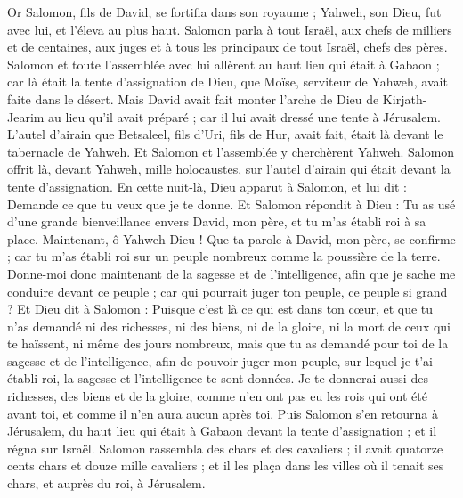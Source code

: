 \begin{multicols}{2}
\VerseOne{}Or Salomon, fils de David, se fortifia dans son royaume ; Yahweh, son Dieu, fut avec lui, et l'éleva au plus haut.
Salomon parla à tout Israël, aux chefs de milliers et de centaines, aux juges et à tous les principaux de tout Israël, chefs des pères.
Salomon et toute l'assemblée avec lui allèrent au haut lieu qui était à Gabaon ; car là était la tente d'assignation de Dieu, que Moïse, serviteur de Yahweh, avait faite dans le désert.
Mais David avait fait monter l'arche de Dieu de Kirjath-Jearim au lieu qu'il avait préparé ; car il lui avait dressé une tente à Jérusalem.
L'autel d'airain que Betsaleel, fils d'Uri, fils de Hur, avait fait, était là devant le tabernacle de Yahweh. Et Salomon et l'assemblée y cherchèrent Yahweh.
Salomon offrit là, devant Yahweh, mille holocaustes, sur l'autel d'airain qui était devant la tente d'assignation.
En cette nuit-là, Dieu apparut à Salomon, et lui dit : Demande ce que tu veux que je te donne.
Et Salomon répondit à Dieu : Tu as usé d'une grande bienveillance envers David, mon père, et tu m'as établi roi à sa place.
Maintenant, ô Yahweh Dieu ! Que ta parole à David, mon père, se confirme ; car tu m'as établi roi sur un peuple nombreux comme la poussière de la terre.
Donne-moi donc maintenant de la sagesse et de l'intelligence, afin que je sache me conduire devant ce peuple ; car qui pourrait juger ton peuple, ce peuple si grand ?
Et Dieu dit à Salomon : Puisque c'est là ce qui est dans ton cœur, et que tu n'as demandé ni des richesses, ni des biens, ni de la gloire, ni la mort de ceux qui te haïssent, ni même des jours nombreux, mais que tu as demandé pour toi de la sagesse et de l'intelligence, afin de pouvoir juger mon peuple, sur lequel je t'ai établi roi,
la sagesse et l'intelligence te sont données. Je te donnerai aussi des richesses, des biens et de la gloire, comme n'en ont pas eu les rois qui ont été avant toi, et comme il n'en aura aucun après toi.
Puis Salomon s'en retourna à Jérusalem, du haut lieu qui était à Gabaon devant la tente d'assignation ; et il régna sur Israël.
Salomon rassembla des chars et des cavaliers ; il avait quatorze cents chars et douze mille cavaliers ; et il les plaça dans les villes où il tenait ses chars, et auprès du roi, à Jérusalem.

\end{multicols}
